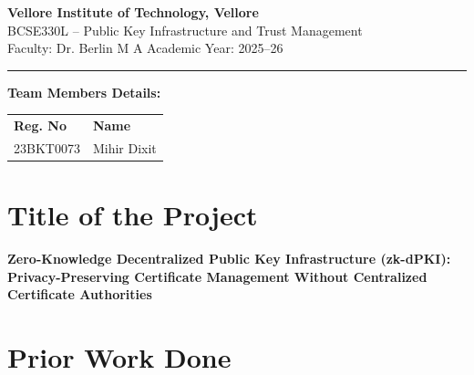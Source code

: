 \documentclass[12pt,a4paper]{article}
\begin{document}
\begin{center}
{\large\bfseries Vellore Institute of Technology, Vellore}\\[0.2cm]
{\normalsize BCSE330L -- Public Key Infrastructure and Trust Management}\\[0.1cm]
{\normalsize Faculty: Dr. Berlin M A \hspace{2cm} Academic Year: 2025--26}
\end{center}
\hrule
\vspace{0.5cm}

\noindent\textbf{Team Members Details:}

\vspace{0.4cm}
\begin{tabular}{p{5cm} p{6cm}}
\textbf{Reg. No} & \textbf{Name} \\[0.3cm]
23BKT0073 & Mihir Dixit \\
\end{tabular}

\vspace{0.8cm}

\section{Title of the Project}

\vspace{0.2cm}
\noindent\textbf{Zero-Knowledge Decentralized Public Key Infrastructure (zk-dPKI): Privacy-Preserving Certificate Management Without Centralized Certificate Authorities}

\vspace{0.8cm}

\section{Prior Work Done}
\end{document}
